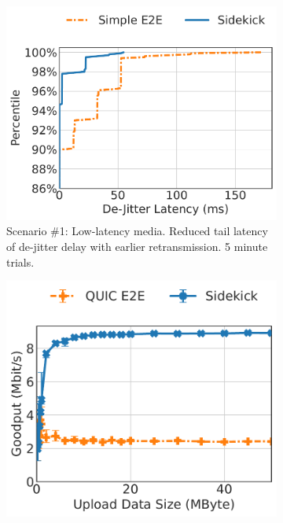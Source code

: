 \begin{figure}
\begin{subfigure}{0.34\textwidth}
\includegraphics[width=\linewidth]{figures/fig4a_low_latency_media.pdf}
\caption{Scenario \#1: Low-latency media.
 Reduced tail latency of de-jitter delay
with earlier retransmission. 5 minute trials.}
\label{fig:media}
\end{subfigure}
\hfill
\begin{subfigure}{0.31\textwidth}
\includegraphics[width=0.97\linewidth]{figures/fig4b_pep_emulation.pdf}

\end{subfigure}
\end{figure}

